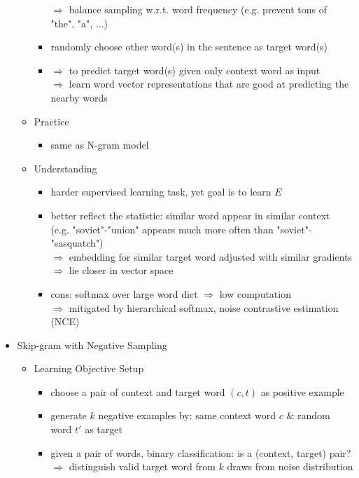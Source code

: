 \begin{itemize}
\begin{itemize}
\begin{itemize}
		$\Rightarrow$ balance sampling w.r.t. word frequency (e.g. prevent tons of "the", "a", ...)
		\item randomly choose other word(s) in the sentence as target word(s)
		\item $\Rightarrow$ to predict target word(s) given only context word as input \\ 
		$\Rightarrow$ learn word vector representations that are good at predicting the nearby words
		\end{itemize}
	\item Practice
		\begin{itemize}
		\item same as N-gram model
		\end{itemize}
	\item Understanding
		\begin{itemize}
		\item harder supervised learning task, yet goal is to learn $E$
		\item better reflect the statistic: similar word appear in similar context \\
		(e.g. "soviet"-"union" appears much more often than "soviet"-"sasquatch") \\
		$\Rightarrow$ embedding for similar target word adjusted with similar gradients \\
		$\Rightarrow$ lie closer in vector space
		\item cons: softmax over large word dict $\Rightarrow$ low computation \\
		$\Rightarrow$ mitigated by hierarchical softmax, noise contrastive estimation (NCE)
		\end{itemize}
	\end{itemize}
\item Skip-gram with Negative Sampling
	\begin{itemize}
	\item Learning Objective Setup
		\begin{itemize}
		\item choose a pair of context and target word $(c,t)$ as positive example
		\item generate $k$ negative examples by: same context word $c$ \& random word $t'$ as target
		\item given a pair of words, binary classification: is a (context, target) pair? \\
		$\Rightarrow$ distinguish valid target word from $k$ draws from noise distribution
		\end{itemize}

\end{itemize}
\end{itemize}
